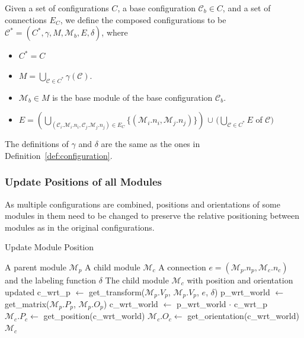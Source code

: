\documentclass[conference]{IEEEtran}
\theoremstyle{definition}
\begin{document}
Given a set of configurations $C$, a base configuration $\mathcal{C}_b\in C$, and a set of connections $E_C$, we define the composed configurations to be $\mathcal{C}^*=(C^*, \gamma, M, \mathcal{M}_b, E, \delta)$, where
\begin{itemize}
\item $C^*=C$
\item $M=\bigcup_{\mathcal{C}\in C^*}{\gamma(\mathcal{C})}$.
\item $\mathcal{M}_b\in M$ is the base module of the base configuration $\mathcal{C}_b$.
\item $E= (\bigcup_{(\mathcal{C}_i.\mathcal{M}_i.n_i, \mathcal{C}_j.\mathcal{M}_j.n_j)\in E_C}{\{(\mathcal{M}_i.n_i, \mathcal{M}_j.n_j)}\})$ $\cup$ $(\bigcup_{\mathcal{C} \in C^*}{E}$ of $\mathcal{C})$
\end{itemize}
The definitions of $\gamma$ and $\delta$ are the same as the ones in Definition~\ref{def:configuration}.

\subsubsection{Update Positions of all Modules} \label{sec:update_position}
As multiple configurations are combined, positions and orientations of some modules in them need to be changed to preserve the relative positioning between modules as in the original configurations.

\begin{algorithm}
\caption{Update Module Position}\label{alg:update_position}
\begin{algorithmic}[1]
\Require
\Statex A parent module $\mathcal{M}_p$
\Statex A child module $\mathcal{M}_c$
\Statex A connection $e=(\mathcal{M}_p.n_p, \mathcal{M}_c.n_c)$ and the labeling function $\delta$
\Ensure
\Statex The child module $\mathcal{M}_c$ with position and orientation updated
\Statex
\State c\_wrt\_p $\gets$ get\_transform($\mathcal{M}_p.V_p$, $\mathcal{M}_p.V_p$, $e$, $\delta$) \label{line:1}
\State p\_wrt\_world $\gets$ get\_matrix($\mathcal{M}_p.P_p$, $\mathcal{M}_p.O_p$) \label{line:2}
\State c\_wrt\_world $\gets$ p\_wrt\_world $\cdot$ c\_wrt\_p \label{line:3}
\State $\mathcal{M}_c.P_c \gets$ get\_position(c\_wrt\_world) \label{line:4}
\State $\mathcal{M}_c.O_c \gets$ get\_orientation(c\_wrt\_world) \label{line:5}
\State \Return $\mathcal{M}_c$
\end{algorithmic}
\end{algorithm}
\end{document}
